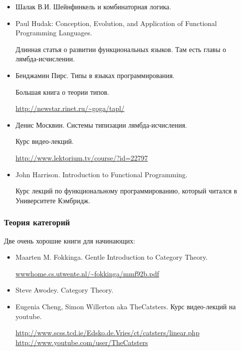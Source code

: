 \begin{itemize}
\item Шалак В.И. Шейнфинкель и комбинаторная логика.
    
\item Paul Hudak: Conception, Evolution, and Application 
        of Functional Programming Languages.

      Длинная статья о развитии функциональных языков.
      Там есть главы о лямбда-исчислении. 

\item Бенджамин Пирс. Типы в языках программирования.

     Большая книга о теории типов. 

     \url{http://newstar.rinet.ru/~goga/tapl/}

\item Денис Москвин. Системы типизации лямбда-исчисления. 

    Курс видео-лекций.

    \url{http://www.lektorium.tv/course/?id=22797}

\item John Harrison. Introduction to Functional Programming.

    Курс лекций по функциональному программированию, который
    читался в Университете Кэмбридж.

\end{itemize}

\subsubsection{Теория категорий}

Две очень хорошие книги для начинающих:

\begin{itemize}
\item Maarten M. Fokkinga. Gentle Introduction to Category Theory.

\url{wwwhome.cs.utwente.nl/~fokkinga/mmf92b.pdf}

\item Steve Awodey. Category Theory.
    
\end{itemize}

\begin{itemize}

\item Eugenia Cheng, Simon Willerton aka TheCatsters. Курс видео-лекций
    на youtube. 

    \url{http://www.scss.tcd.ie/Edsko.de.Vries/ct/catsters/linear.php}
    \url{http://www.youtube.com/user/TheCatsters}
\end{itemize}

